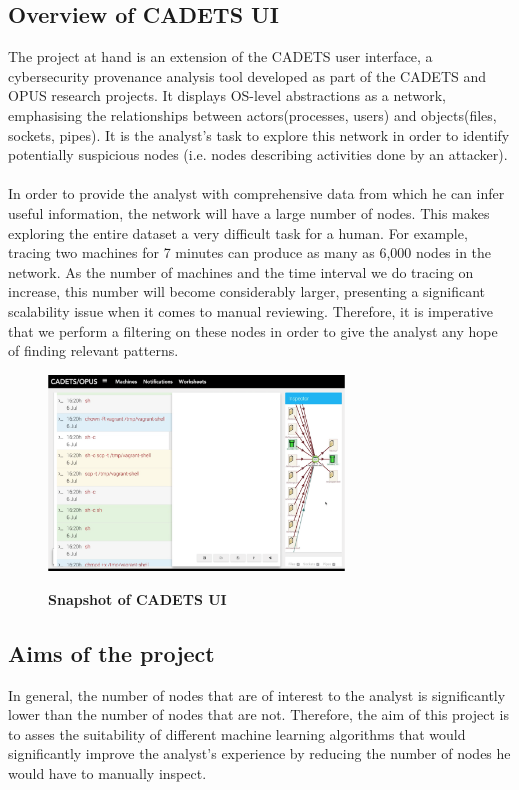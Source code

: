	\subsection{Overview of CADETS UI}\label{1.1.1}
	The project at hand is an extension of the CADETS user interface, a cybersecurity provenance analysis tool developed as part of the CADETS and OPUS research projects. It displays OS-level abstractions as a network, emphasising the relationships between actors(processes, users) and objects(files, sockets, pipes). It is the analyst's task to explore this network in order to identify potentially suspicious nodes (i.e. nodes describing activities done by an attacker). 
	\\ \\
	In order to provide the analyst with comprehensive data from which he can infer useful information, the network will have a large number of nodes. This makes exploring the entire dataset a very difficult task for a human.  For example, tracing two machines for 7 minutes can produce as many as 6,000 nodes in the network. As the number of machines and the time interval we do tracing on increase, this number will become considerably larger, presenting a significant scalability issue when it comes to manual reviewing. Therefore, it is imperative that we perform a filtering on these nodes in order to give the analyst any hope of finding relevant patterns.
	\begin{figure}[H]
		\centering
		\includegraphics[width=0.7\textwidth]{graphics/CADETS}
		\label{Figure 1.1}
		\caption{\bf Snapshot of CADETS UI}
	\end{figure}
	
	\subsection{Aims of the project}
	In general, the number of nodes that are of interest to the analyst is significantly lower than the number of nodes that are not. Therefore, the aim of this project is to asses the suitability of different machine learning algorithms that would significantly improve the analyst's experience by reducing the number of nodes he would have to manually inspect. 
	
